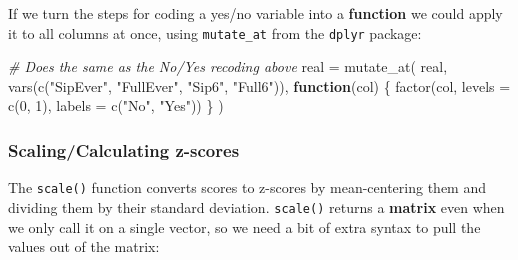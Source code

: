 \documentclass[
]{book}
\newenvironment{Shaded}{\begin{snugshade}}{\end{snugshade}}
\newcommand{\AttributeTok}[1]{\textcolor[rgb]{0.77,0.63,0.00}{#1}}
\newcommand{\CommentTok}[1]{\textcolor[rgb]{0.56,0.35,0.01}{\textit{#1}}}
\newcommand{\ControlFlowTok}[1]{\textcolor[rgb]{0.13,0.29,0.53}{\textbf{#1}}}
\newcommand{\DecValTok}[1]{\textcolor[rgb]{0.00,0.00,0.81}{#1}}
\newcommand{\FunctionTok}[1]{\textcolor[rgb]{0.00,0.00,0.00}{#1}}
\newcommand{\NormalTok}[1]{#1}
\newcommand{\OtherTok}[1]{\textcolor[rgb]{0.56,0.35,0.01}{#1}}
\newcommand{\SpecialCharTok}[1]{\textcolor[rgb]{0.00,0.00,0.00}{#1}}
\newcommand{\StringTok}[1]{\textcolor[rgb]{0.31,0.60,0.02}{#1}}
\begin{document}
If we turn the steps for coding a yes/no variable into
a \textbf{function} we could apply it to all columns at once,
using \texttt{mutate\_at} from the \texttt{dplyr} package:

\begin{Shaded}
\begin{Highlighting}[]
\CommentTok{\# Does the same as the No/Yes recoding above}
\NormalTok{real }\OtherTok{=} \FunctionTok{mutate\_at}\NormalTok{(}
\NormalTok{    real,}
    \FunctionTok{vars}\NormalTok{(}\FunctionTok{c}\NormalTok{(}\StringTok{"SipEver"}\NormalTok{, }\StringTok{"FullEver"}\NormalTok{, }\StringTok{"Sip6"}\NormalTok{, }\StringTok{"Full6"}\NormalTok{)),}
    \ControlFlowTok{function}\NormalTok{(col) \{}
        \FunctionTok{factor}\NormalTok{(col,}
               \AttributeTok{levels =} \FunctionTok{c}\NormalTok{(}\DecValTok{0}\NormalTok{, }\DecValTok{1}\NormalTok{),}
               \AttributeTok{labels =} \FunctionTok{c}\NormalTok{(}\StringTok{"No"}\NormalTok{, }\StringTok{"Yes"}\NormalTok{))}
\NormalTok{    \}}
\NormalTok{)}
\end{Highlighting}
\end{Shaded}

\hypertarget{scalingcalculating-z-scores}{%
\subsubsection*{Scaling/Calculating z-scores}\label{scalingcalculating-z-scores}}

The \texttt{scale()} function converts scores to z-scores by mean-centering
them and dividing them by their standard deviation. \texttt{scale()} returns
a \textbf{matrix} even when we only call it on a single vector, so we need
a bit of extra syntax to pull the values out of the matrix:

\begin{Shaded}
\end{Shaded}
\end{document}
